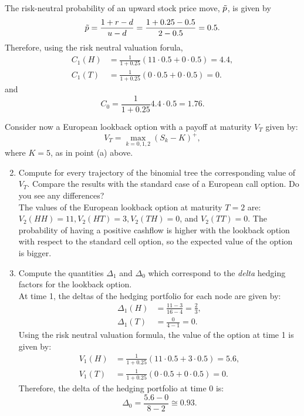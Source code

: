 \documentclass[11pt,a4,table]{article}
\begin{document}
\begin{enumerate}
\begin{enumerate}
        The risk-neutral probability of an upward stock price move, $\Tilde{p}$, is given by
        \begin{equation*}
            \Tilde{p}=\frac{1+r-d}{u-d} = \frac{1+0.25-0.5}{2-0.5}=0.5.
        \end{equation*}
        Therefore, using the risk neutral valuation forula,
        \begin{align*}
            C_1(H) &=\frac{1}{1+0.25}(11\cdot 0.5 + 0\cdot 0.5) = 4.4,\\
            C_1(T) &=\frac{1}{1+0.25}(0\cdot 0.5 + 0\cdot 0.5) = 0.
        \end{align*}
        and
        \begin{equation*}
            C_0 = \frac{1}{1+0.25}4.4\cdot 0.5 = 1.76.
        \end{equation*}
    \end{enumerate}

    Consider now a European lookback option with a payoff at maturity $V_T$ given by:
    \begin{equation*}
        V_T=\max_{k=0,1,2}(S_k-K)^+,
    \end{equation*}
    where $K=5$, as in point (a) above.
    
    \begin{enumerate}
        \setcounter{enumii}{1}
    
        \item Compute for every trajectory of the binomial tree the corresponding value of $V_T$. Compare the results with the standard case of a European call option. Do you see any differences?\\
        The values of the European lookback option at maturity $T=2$ are: $V_2(HH)=11, V_2(HT)=3, V_2(TH)=0$, and $V_2(TT)=0$. The probability of having a positive cashflow is higher with the lookback option with respect to the standard cell option, so the expected value of the option is bigger.
    
        \item Compute the quantities $\Delta_1$ and $\Delta_0$ which correspond to the \textit{delta} hedging factors for the lookback option.\\
        At time 1, the deltas of the hedging portfolio for each node are given by:
        \begin{align*}
            \Delta_1(H) &= \frac{11-3}{16-4} = \frac{2}{3},\\
            \Delta_1(T) &= \frac{0}{4-1} = 0.
        \end{align*}
        Using the risk neutral valuation formula, the value of the option at time 1 is given by:
        \begin{align*}
            V_1(H) &= \frac{1}{1+0.25}(11\cdot 0.5 + 3\cdot 0.5)= 5.6,\\
            V_1(T) &= \frac{1}{1+0.25}(0\cdot 0.5 + 0\cdot 0.5) = 0.
        \end{align*}
        Therefore, the delta of the hedging portfolio at time 0 is:
        \begin{equation*}
            \Delta_0 = \frac{5.6-0}{8-2}\cong 0.93.
        \end{equation*}
        

\end{enumerate}
\end{enumerate}
\end{document}
